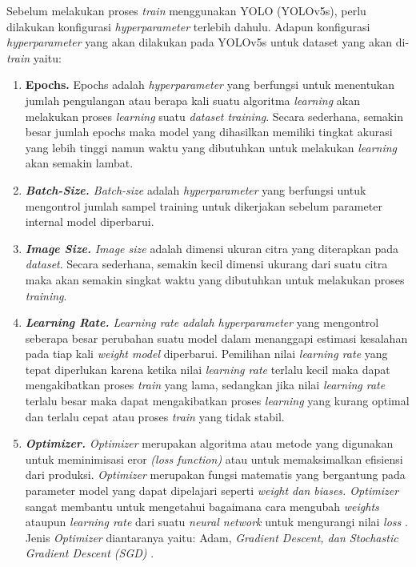 Sebelum melakukan proses \textit{train} menggunakan YOLO (YOLOv5s), perlu dilakukan konfigurasi \textit{hyperparameter} terlebih dahulu. Adapun konfigurasi \textit{hyperparameter} yang akan dilakukan pada YOLOv5s untuk dataset yang akan di-\textit{train} yaitu: \par

\begin{enumerate}
    \item \textbf{Epochs.} Epochs adalah \textit{hyperparameter} yang berfungsi untuk menentukan jumlah pengulangan atau berapa kali suatu algoritma \textit{learning} akan melakukan proses \textit{learning} suatu \textit{dataset training}. Secara sederhana, semakin besar jumlah epochs maka model yang dihasilkan memiliki tingkat akurasi yang lebih tinggi namun waktu yang dibutuhkan untuk melakukan \textit{learning} akan semakin lambat. 
    \item \textit{\textbf{Batch-Size.} Batch-size} adalah \textit{hyperparameter} yang berfungsi untuk mengontrol jumlah sampel training untuk dikerjakan sebelum parameter internal model diperbarui. 
    \item \textit{\textbf{Image Size.}} \textit{Image size} adalah dimensi ukuran citra yang diterapkan pada \textit{dataset}. Secara sederhana, semakin kecil dimensi ukurang dari suatu citra maka akan semakin singkat waktu yang dibutuhkan untuk melakukan proses \textit{training}.
    \item \textit{\textbf{Learning Rate.} Learning rate \textnormal{adalah} hyperparameter} yang mengontrol seberapa besar perubahan suatu model dalam menanggapi estimasi kesalahan pada tiap kali \textit{weight model} diperbarui. Pemilihan nilai \textit{learning rate} yang tepat diperlukan karena ketika nilai \textit{learning rate} terlalu kecil maka dapat mengakibatkan proses \textit{train} yang lama, sedangkan jika nilai \textit{learning rate} terlalu besar maka dapat mengakibatkan proses \textit{learning} yang kurang optimal dan terlalu cepat atau proses \textit{train} yang tidak stabil.
    \item \textit{\textbf{Optimizer.} Optimizer} merupakan algoritma atau metode yang digunakan untuk meminimisasi eror \textit{(loss function)} atau untuk memaksimalkan efisiensi dari produksi. \textit{Optimizer} merupakan fungsi matematis yang bergantung pada parameter model yang dapat dipelajari seperti \textit{weight \textnormal{dan} biases. Optimizer} sangat membantu untuk mengetahui bagaimana cara mengubah \textit{weights} ataupun \textit{learning rate} dari suatu \textit{neural network} untuk mengurangi nilai \textit{loss} \citep*{optimizerdl}. Jenis \textit{Optimizer} diantaranya yaitu: Adam, \textit{Gradient Descent, \textnormal{dan} Stochastic Gradient Descent (SGD)} \citep*{dlguideoptimizer}. 
\end{enumerate}

